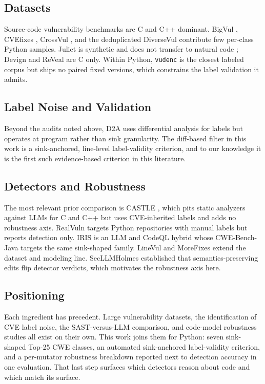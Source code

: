 \subsection{Datasets}

Source-code vulnerability benchmarks are C and C++ dominant. BigVul
\cite{bigvul}, CVEfixes \cite{cvefixes}, CrossVul \cite{crossvul}, and the
deduplicated DiverseVul \cite{diversevul} contribute few per-class Python
samples. Juliet \cite{juliet} is synthetic and does not transfer to natural code
\cite{reveal}; Devign and ReVeal \cite{devign,reveal} are C only. Within Python,
\texttt{vudenc} \cite{vudenc} is the closest labeled corpus but ships no paired
fixed versions, which constrains the label validation it admits.

\subsection{Label Noise and Validation}

Beyond the audits noted above, D2A \cite{d2a} uses differential analysis for
labels but operates at program rather than sink granularity. The diff-based
filter in this work is a sink-anchored, line-level label-validity criterion,
and to our knowledge it is the first such evidence-based criterion in this
literature.

\subsection{Detectors and Robustness}

The most relevant prior comparison is CASTLE \cite{castle}, which pits static
analyzers against LLMs for C and C++ but uses CVE-inherited labels and adds no
robustness axis. RealVuln \cite{realvuln} targets Python repositories with
manual labels but reports detection only. IRIS \cite{iris} is an LLM and CodeQL
hybrid whose CWE-Bench-Java targets the same sink-shaped family. LineVul
\cite{linevul} and MoreFixes \cite{morefixes} extend the dataset and modeling
line. SecLLMHolmes \cite{secllmholmes} established that semantics-preserving
edits flip detector verdicts, which motivates the robustness axis here.

\subsection{Positioning}

Each ingredient has precedent. Large vulnerability datasets, the identification
of CVE label noise, the SAST-versus-LLM comparison, and code-model robustness
studies all exist on their own. This work joins them for Python: seven
sink-shaped Top-25 CWE classes, an automated sink-anchored label-validity
criterion, and a per-mutator robustness breakdown reported next to detection
accuracy in one evaluation. That last step surfaces which detectors reason about
code and which match its surface.
